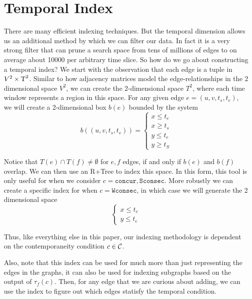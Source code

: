 \section{Temporal Index}

There are many efficient indexing techniques. But the temporal dimension allows
us an additional method by which we can filter our data. In fact it is a very
strong filter that can prune a search space from tens of millions of edges to on
average about 10000 per arbitrary time slice. So how do we go about constructing
a temporal index?  We start with the observation that each edge is a tuple in
$V^2 \times \text{T}^2$. Similar to how adjacency matrices model the
edge-relationships in the 2 dimensional space $V^2$, we can create the
2-dimensional space $T^2$, where each time window represents a region in this
space. For any given edge $e = (u,v, t_s, t_e)$, we will create a 2-dimensional
box $b(e)$ bounded by the system
\[b((u,v, t_s, t_e)) =
  \begin{cases}
    x \leq t_e \\
    x \geq t_s \\
    y \leq t_e \\
    y \geq t_S
  \end{cases}
\]

Notice that $T(e) \cap T(f) \neq \emptyset$ for $e,f$ edges, if and only if
$b(e)$ and $b(f)$ overlap. We can then use an R+Tree to index this space. In
this form, this tool is only useful for when we consider $c = \texttt{concur},
\texttt{Sconsec}$.  More robustly we can create a specific index for when $c =
\texttt{Wconsec}$, in which case we will generate the 2 dimensional space
\[ \begin{cases}
     x \leq t_e \\
     y \leq t_e
   \end{cases}
\]

Thus, like everything else in this paper, our indexing methodology is dependent
on the contemporaneity condition $c \in \mathcal{C}$. 

Also, note that this index can be used for much more than just representing the
edges in the graphs, it can also be used for indexing subgraphs based on the output
of $\tau_f(c)$.  Then, for any edge that we are curious about adding, we can use
the index to figure out which edges statisfy the temporal condition. 

  
